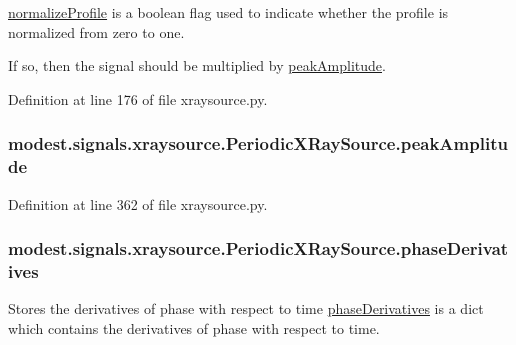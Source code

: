 \hyperlink{classmodest_1_1signals_1_1xraysource_1_1PeriodicXRaySource_ac7490bebcc1d508b7813ea274cc36702}{normalize\+Profile} is a boolean flag used to indicate whether the profile is normalized from zero to one. 

If so, then the signal should be multiplied by \hyperlink{classmodest_1_1signals_1_1xraysource_1_1PeriodicXRaySource_ab9ca2f0588f7e2f23c5301e05070fe99}{peak\+Amplitude}. 

Definition at line 176 of file xraysource.\+py.

\subsubsection[{\texorpdfstring{peak\+Amplitude}{peakAmplitude}}]{\setlength{\rightskip}{0pt plus 5cm}modest.\+signals.\+xraysource.\+Periodic\+X\+Ray\+Source.\+peak\+Amplitude}\hypertarget{classmodest_1_1signals_1_1xraysource_1_1PeriodicXRaySource_ab9ca2f0588f7e2f23c5301e05070fe99}{}\label{classmodest_1_1signals_1_1xraysource_1_1PeriodicXRaySource_ab9ca2f0588f7e2f23c5301e05070fe99}


Definition at line 362 of file xraysource.\+py.

\subsubsection[{\texorpdfstring{phase\+Derivatives}{phaseDerivatives}}]{\setlength{\rightskip}{0pt plus 5cm}modest.\+signals.\+xraysource.\+Periodic\+X\+Ray\+Source.\+phase\+Derivatives}\hypertarget{classmodest_1_1signals_1_1xraysource_1_1PeriodicXRaySource_ad885c269b3b042b3d094412683ef3476}{}\label{classmodest_1_1signals_1_1xraysource_1_1PeriodicXRaySource_ad885c269b3b042b3d094412683ef3476}


Stores the derivatives of phase with respect to time  \hyperlink{classmodest_1_1signals_1_1xraysource_1_1PeriodicXRaySource_ad885c269b3b042b3d094412683ef3476}{phase\+Derivatives} is a dict which contains the derivatives of phase with respect to time. 

